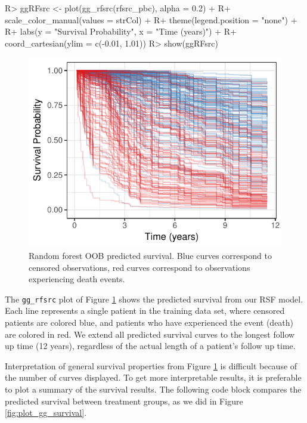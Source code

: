 \documentclass[article]{jss}
\begin{document}
\begin{Schunk}
\begin{Sinput}
R> ggRFsrc <- plot(gg_rfsrc(rfsrc_pbc), alpha = 0.2) +
R+   scale_color_manual(values = strCol) +
R+   theme(legend.position = "none") +
R+   labs(y = "Survival Probability", x = "Time (years)") +
R+   coord_cartesian(ylim = c(-0.01, 1.01))
R> show(ggRFsrc)
\end{Sinput}
\begin{figure}[!htb]

{\centering \includegraphics{fig-rfs/rfs-rfsrc-plot-1} 

}

\caption[Random forest OOB predicted survival]{Random forest OOB predicted survival. Blue curves correspond to censored observations, red curves correspond to observations experiencing death events.}\label{fig:rfsrc-plot}
\end{figure}
\end{Schunk}

The \texttt{gg\_rfsrc} plot of Figure \ref{fig:rfsrc-plot} shows the
predicted survival from our RSF model. Each line represents a single
patient in the training data set, where censored patients are colored
blue, and patients who have experienced the event (death) are colored in
red. We extend all predicted survival curves to the longest follow up
time (12 years), regardless of the actual length of a patient's follow
up time.

Interpretation of general survival properties from Figure
\ref{fig:rfsrc-plot} is difficult because of the number of curves
displayed. To get more interpretable results, it is preferable to plot a
summary of the survival results. The following code block compares the
predicted survival between treatment groups, as we did in Figure
\ref{fig:plot_gg_survival}.
\end{document}
